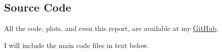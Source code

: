 \subsection{Source Code}

All the code, plots, and even this report, are available at my \href{https://github.com/gibbona1/TCD_FinalYearProject}{GitHub}. 

I will include the main code files in text below.



%





%

%

%